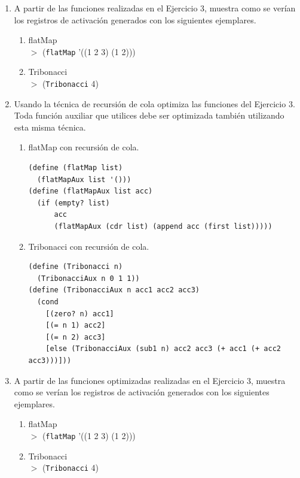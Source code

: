 \documentclass[11pt]{article}
\begin{document}
\begin{enumerate}[leftmargin=0.8cm]
\begin{enumerate}
        $>$ (\texttt{Tribonacci} 5)\\
        $>$ 7\\
        La función quedaría definida como:
        \begin{lstlisting}
(define (Tribonacci n)
  (cond
    [(zero? n) 0]
    [(or (= n 2) (= n 1)) 1]
    [else (+ (Tribonacci (sub1 n)) 
          (+ (Tribonacci (- n 2)) (Tribonacci (- n 3))))]))
        \end{lstlisting}
    \end{enumerate}
    \item A partir de las funciones realizadas en el Ejercicio 3, muestra como se verían los registros de activación generados con los siguientes ejemplares.
    \begin{enumerate}
        \item flatMap\\
        $>$ (\texttt{flatMap} '((1 2 3) (1 2))) 
        \item Tribonacci\\
        $>$ (\texttt{Tribonacci} 4)\\
    \end{enumerate}
    \item Usando la técnica de recursión de cola optimiza las funciones del Ejercicio 3. Toda función auxiliar que utilices debe ser optimizada también utilizando esta misma técnica.\\
    \begin{enumerate}
        \item flatMap con recursión de cola.
        \begin{lstlisting}
(define (flatMap list)
  (flatMapAux list '()))
(define (flatMapAux list acc)
  (if (empty? list)
      acc
      (flatMapAux (cdr list) (append acc (first list)))))
        \end{lstlisting}
        \item Tribonacci con recursión de cola.
        \begin{lstlisting}
(define (Tribonacci n)
  (TribonacciAux n 0 1 1))
(define (TribonacciAux n acc1 acc2 acc3)
  (cond
    [(zero? n) acc1]
    [(= n 1) acc2]
    [(= n 2) acc3]
    [else (TribonacciAux (sub1 n) acc2 acc3 (+ acc1 (+ acc2 acc3)))]))
        \end{lstlisting}
    \end{enumerate}
    \item A partir de las funciones optimizadas realizadas en el Ejercicio 3, muestra como se verían los registros de activación generados con los siguientes ejemplares.
    \begin{enumerate}
        \item flatMap\\
        $>$ (\texttt{flatMap} '((1 2 3) (1 2)))
        \item Tribonacci\\
        $>$ (\texttt{Tribonacci} 4)\\
    \end{enumerate}
\end{enumerate}
\end{document}
